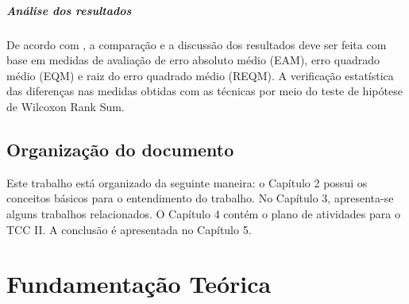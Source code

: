 \documentclass[	12pt, Times, openright, twoside, a4paper, english, brazil]{abntex2}
\begin{document}
        
        \paragraph*{Análise dos resultados}
        De acordo com \cite{Flavia2014}, a comparação e a discussão dos resultados deve ser feita com base em medidas de avaliação de erro absoluto médio (EAM), erro quadrado médio (EQM) e raiz do erro quadrado médio (REQM). A verificação estatística das diferenças nas medidas obtidas com as técnicas por meio do teste de hipótese de Wilcoxon Rank Sum. 

      \section{Organização do documento}
        Este trabalho está organizado da seguinte maneira: o Capítulo 2 possui os conceitos básicos para o entendimento do trabalho. No Capítulo 3, apresenta-se alguns trabalhos relacionados. O Capítulo 4 contém o plano de atividades para o TCC II. A conclusão é apresentada no Capítulo 5.
  \chapter{Fundamentação Teórica}

\end{document}
